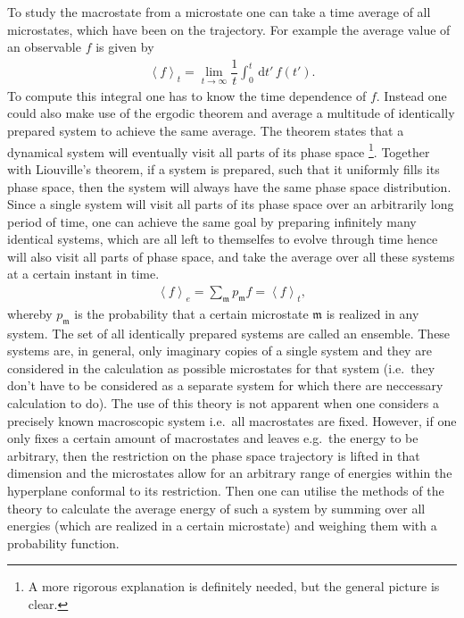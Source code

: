 \documentclass[a4paper,10pt]{article}
\newcommand{\td}{\,\text{d}}
\numberwithin{equation}{section}
\begin{document}
\begin{multicols}{2}
To study the macrostate from a microstate one can take a time average of all microstates, which have been on the trajectory.
For example the average value of an observable $f$ is given by
\begin{align} 
  \left\langle f \right\rangle _t=\lim_{t\rightarrow \infty}\dfrac{1}{t}\int_{0}^{t}\td t'\,f(t')
.\end{align} 
To compute this integral one has to know the time dependence of $f$. 
Instead one could also make use of the ergodic theorem and average a multitude of identically prepared system to achieve the same average.
The theorem states that a dynamical system will eventually visit all parts of its phase space
\footnote{A more rigorous explanation is definitely needed, but the general picture is clear.}.
Together with Liouville's theorem, if a system is prepared, such that it uniformly fills its phase space, then the system will always have the same phase space distribution.
Since a single system will visit all parts of its phase space over an arbitrarily long period of time, one can achieve the same goal by preparing infinitely many identical systems, which are all left to themselfes to evolve through time hence will also visit all parts of phase space, and take the average over all these systems at a certain instant in time.
\begin{align} 
  \left\langle f \right\rangle _e=\sum_{\mathfrak{m}}^{}p_\mathfrak{m} f = \left\langle f \right\rangle _t
,\end{align} 
whereby $p_\mathfrak{m}$ is the probability that a certain microstate $\mathfrak{m}$ is realized in any system.
The set of all identically prepared systems are called an ensemble.
These systems are, in general, only imaginary copies of a single system and they are considered in the calculation as possible microstates for that system (i.e.\ they don't have to be considered as a separate system for which there are neccessary calculation to do).
The use of this theory is not apparent when one considers a precisely known macroscopic system i.e.\ all macrostates are fixed.
However, if one only fixes a certain amount of macrostates and leaves e.g.\ the energy to be arbitrary, then the restriction on the phase space trajectory is lifted in that dimension and the microstates allow for an arbitrary range of energies within the hyperplane conformal to its restriction.
Then one can utilise the methods of the theory to calculate the average energy of such a system by summing over all energies (which are realized in a certain microstate) and weighing them with a probability function.


\end{multicols}
\end{document}
